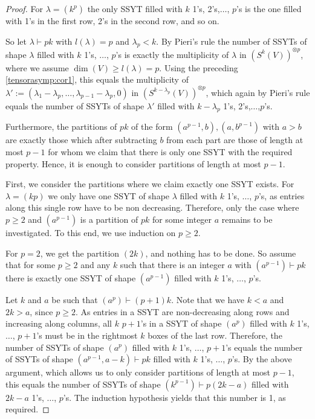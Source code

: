 \documentclass[a4paper]{amsart}
\begin{document}
\begin{proof}
	For $\lambda=(k^p)$ the only SSYT filled with $k$ 1's, 2's,$\ldots$, $p$'s is the one filled with 1's in the first row, 2's in the second row, and so on.
	
	So let $\lambda\vdash pk$ with $l(\lambda)=p$ and $\lambda_p<k$.
	By Pieri's rule the number of SSYTs of shape $\lambda$ filled with $k$ 1's, $\ldots$, $p$'s is exactly the multiplicity of $\lambda$ in $(S^k (V))^{\otimes p}$, where we assume $\dim(V)\geq l(\lambda)=p$.
	Using the preceding \cref{tensorasymp:cor1}, this equals the multiplicity of $\lambda':=(\lambda_1-\lambda_p,\ldots,\lambda_{p-1}-\lambda_p,0)$ in $(S^{k-\lambda_p} (V))^{\otimes p}$,
	which again by Pieri's rule equals the number of SSYTs of shape $\lambda'$ filled with $k-\lambda_p$ 1's, 2's,$\ldots$,$p$'s.

	Furthermore, the partitions of $pk$ of the form $(a^{p-1},b), (a,b^{p-1})$ with $a>b$ are exactly those which after subtracting $b$ from each part are those of length at most $p-1$ for whom we claim that there is only one SSYT with the required property.
	Hence, it is enough to consider partitions of length at most $p-1$.
	
	First, we consider the partitions where we claim exactly one SSYT exists.
	For $\lambda=({kp})$ we only have one SSYT of shape $\lambda$ filled with $k$ 1's, $\ldots$, $p$'s,
	as entries along this single row have to be non decreasing.
	Therefore,
	only the case where $p\geq 2$ and $(a^{p-1})$ is a partition of $pk$ for some integer $a$ remains to be investigated.
	To this end, we use induction on $p\geq 2$.
	
	For $p=2$, we get the partition $(2k)$, and nothing has to be done.
	So assume that for some $p\geq 2$ and any $k$ such that there is an integer $a$ with $(a^{p-1})\vdash pk$ there is exactly one SSYT of shape $(a^{p-1})$ filled with $k$ 1's, $\ldots$, $p$'s.
	
	Let $k$ and $a$ be such that $(a^p)\vdash (p+1)k$.
	Note that we have $k<a$ and $2k>a$, since $p\geq 2$.
	As entries in a SSYT are non-decreasing along rows and increasing along columns,
	all $k$ $p+1$'s in a SSYT of shape $(a^p)$ filled with $k$ 1's, $\ldots$, $p+1$'s must be in the rightmost $k$ boxes of the last row.
	Therefore,
	the number of SSYTs of shape $(a^p)$ filled with $k$ 1's, $\ldots$, $p+1$'s equals the number of SSYTs of shape $(a^{p-1},a-k)\vdash pk$ filled with $k$ 1's, $\ldots$, $p$'s.
	By the above argument, which allows us to only consider partitions of length at most $p-1$,
	this equals the number of SSYTs of shape $(k^{p-1})\vdash p(2k-a)$ filled with $2k-a$ 1's, $\ldots$, $p$'s.
	The induction hypothesis yields that this number is 1, as required.
	

\end{proof}
\end{document}
